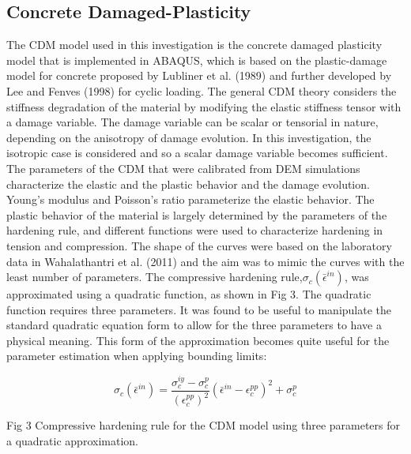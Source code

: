 \subsection{Concrete Damaged-Plasticity}

The CDM model used in this investigation is the concrete damaged plasticity
model that is implemented in ABAQUS, which is based on the plastic-damage
model for concrete proposed by Lubliner et al. (1989) and further
developed by Lee and Fenves (1998) for cyclic loading. The general
CDM theory considers the stiffness degradation of the material by
modifying the elastic stiffness tensor with a damage variable. The
damage variable can be scalar or tensorial in nature, depending on
the anisotropy of damage evolution. In this investigation, the isotropic
case is considered and so a scalar damage variable becomes sufficient.
The parameters of the CDM that were calibrated from DEM simulations
characterize the elastic and the plastic behavior and the damage evolution.
Young's modulus and Poisson's ratio parameterize the elastic behavior.
The plastic behavior of the material is largely determined by the
parameters of the hardening rule, and different functions were used
to characterize hardening in tension and compression. The shape of
the curves were based on the laboratory data in Wahalathantri et al.
(2011) and the aim was to mimic the curves with the least number of
parameters. The compressive hardening rule,$\sigma_{c}\left(\bar{\epsilon}^{in}\right)$,
was approximated using a quadratic function, as shown in Fig 3. The
quadratic function requires three parameters. It was found to be useful
to manipulate the standard quadratic equation form to allow for the
three parameters to have a physical meaning. This form of the approximation
becomes quite useful for the parameter estimation when applying bounding
limits:

\begin{equation}
\sigma_{c}\left(\bar{\epsilon}^{in}\right)=\frac{\sigma_{c}^{iy}-\sigma_{c}^{p}}{\left(\epsilon_{c}^{pp}\right)^{2}}\left(\bar{\epsilon}^{in}-\epsilon_{c}^{pp}\right)^{2}+\sigma_{c}^{p}\label{eqn:param2-1}
\end{equation}


Fig 3 Compressive hardening rule for the CDM model using three parameters
for a quadratic approximation.

